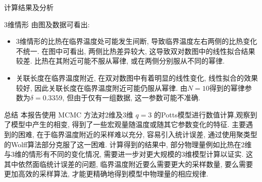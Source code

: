 \documentclass{article}
\begin{document}
\begin{section}{计算结果及分析}
\begin{subsection}{3维情形}
    由图及数据可看出:
    \begin{itemize}
        \item 3维情形的比热在临界温度处可能发生间断, 导致临界温度左右两侧的比热变化不统一. 在图中可看出, 两侧比热差异较大, 这导致双对数图中的线性拟合结果较差.
        比热在其附近可能不服从幂律, 或在两侧分别服从不同的幂律.
        \item 关联长度在临界温度附近, 在双对数图中有着明显的线性变化, 线性拟合的效果较好, 因此关联长度在临界温度附近可能仍服从幂律. 由$N=10$得到的幂律参数为$\delta=0.3359$, 但由于仅有一组数据, 这一参数可能不准确.
    \end{itemize}
\end{subsection}
\end{section}
\begin{section}{总结}
    本报告使用 MCMC 方法对2维及3维 $q=3$ 的Potts模型进行数值计算,观察到了模型中产生的相变, 得到了一些宏观量随温度或随其它参数变化的特征. 主要遇到的困难, 在于临界温度附近的采样难以充分, 
    容易引入统计误差, 通过使用聚类型的Wolff算法部分克服了这一困难. 计算得到的结果中, 部分物理量例如比热在2维与3维的情形有不同的变化情况, 需要进一步对更大规模的3维模型计算以证实. 这其中依然面临统计误差的问题, 
    临界温度附近要么需要更大的采样数量, 要么需要更加高效的采样算法, 才能更精确地得到模型中物理量的相应规律.
    
\end{section}
\end{document}
